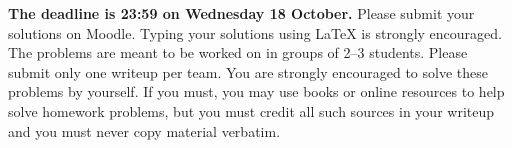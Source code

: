 






\textbf{The deadline is 23:59 on Wednesday 18 October.} Please submit your solutions on Moodle. Typing
your solutions using \LaTeX{} is strongly encouraged. The problems are meant to be worked on in groups of
2--3 students. Please submit only one writeup per team. You are strongly encouraged to solve these
problems by yourself. If you must, you may use books or online resources to help solve homework problems,
but you must credit all such sources in your writeup and you must never copy material verbatim. 

\vspace{1cm}








